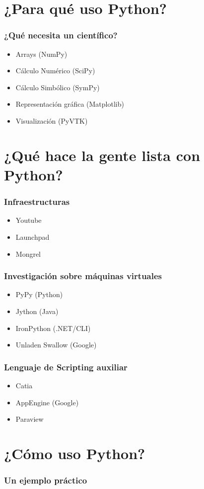 \documentclass[12pt,mathserif,compress]{beamer}
\begin{document}
\section{¿Para qué uso Python?}
\begin{frame}
  \frametitle{¿Qué necesita un científico?}
  \begin{itemize}
  \item Arrays (NumPy)
  \item Cálculo Numérico (SciPy)
  \item Cálculo Simbólico (SymPy)
  \item Representación gráfica (Matplotlib)
  \item Visualización (PyVTK)
  \end{itemize}
\end{frame}



\section{¿Qué hace la gente lista con Python?}

\begin{frame}
  \frametitle{Infraestructuras}
  \begin{itemize}
  \item Youtube
  \item Launchpad 
  \item Mongrel
  \end{itemize}
\end{frame}

\begin{frame}
  \frametitle{Investigación sobre máquinas virtuales}
  \begin{itemize}
  \item PyPy (Python)
  \item Jython (Java)
  \item IronPython (.NET/CLI)
  \item Unladen Swallow (Google)
  \end{itemize}
\end{frame}

\begin{frame}
  \frametitle{Lenguaje de Scripting auxiliar}
  \begin{itemize}
  \item Catia
  \item AppEngine (Google)
  \item Paraview
  \end{itemize}
\end{frame}
\section{¿Cómo uso Python?}

\begin{frame}
  \frametitle{Un ejemplo práctico}
\end{frame}
\end{document}
